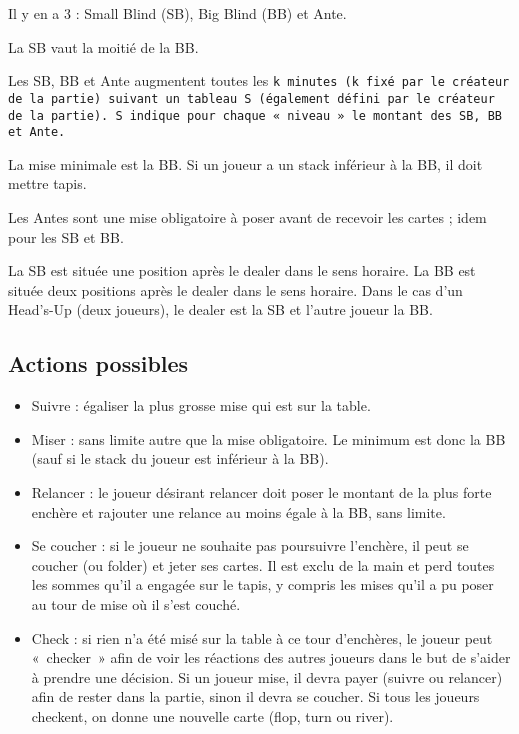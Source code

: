 Il y en a 3 : Small Blind (SB), Big Blind (BB) et Ante.

La SB vaut la moitié de la BB.

Les SB, BB et Ante augmentent toutes les \tt k \rm minutes (\tt k \rm fixé par le créateur de la partie) suivant un tableau \tt S \rm (également défini par le créateur de la partie).
\tt S \rm indique pour chaque «~niveau~» le montant des SB, BB et Ante.

La mise minimale est la BB.
Si un joueur a un stack inférieur à la BB, il doit mettre tapis.

Les Antes sont une mise obligatoire à poser avant de recevoir les cartes ; idem pour les SB et BB.

La SB est située une position après le dealer dans le sens horaire.
La BB est située deux positions après le dealer dans le sens horaire.
Dans le cas d'un Head's-Up (deux joueurs), le dealer est la SB et l'autre joueur la BB.

\subsection{Actions possibles}

\begin{itemize}
	\item Suivre : égaliser la plus grosse mise qui est sur la table.
	\item Miser : sans limite autre que la mise obligatoire. Le minimum est donc la BB (sauf si le stack du joueur est inférieur à la BB).
	\item Relancer : le joueur désirant relancer doit poser le montant de la plus forte enchère et rajouter une relance au moins égale à la BB, sans limite.
	\item Se coucher : si le joueur ne souhaite pas poursuivre l'enchère, il peut se coucher (ou folder) et jeter ses cartes. Il est exclu de la main et perd toutes les sommes qu'il a engagée sur le tapis, y compris les mises qu'il a pu poser au tour de mise où il s'est couché.
	\item Check : si rien n'a été misé sur la table à ce tour d'enchères, le joueur peut «~checker~» afin de voir les réactions des autres joueurs dans le but de s'aider à prendre une décision. Si un joueur mise, il devra payer (suivre ou relancer) afin de rester dans la partie, sinon il devra se coucher. Si tous les joueurs checkent, on donne une nouvelle carte (flop, turn ou river).
\end{itemize}

